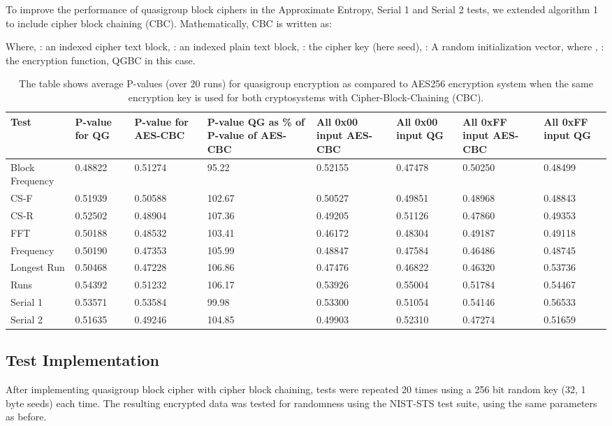 \documentclass[conference]{IEEEtran}
\begin{document}
To improve the performance of quasigroup block ciphers in the Approximate Entropy, Serial 1 and Serial 2 tests, we extended algorithm 1 to include cipher block chaining (CBC). Mathematically, CBC is written as:




Where, : an indexed cipher text block, : an indexed plain text block, : the cipher key (here seed), : A random initialization vector, where , : the encryption function, QGBC in this case.

\begin{table*}
\centering
\begin{tabular}{|p{2cm}|p{1.5cm}|p{1.5cm}|p{2.25cm}||p{1.5cm}|p{1.5cm}|p{1.5cm}|p{1.5cm}|}
\hline
Test & P-value for QG&  P-value for AES-CBC&  P-value QG as \% of P-value of AES-CBC& All 0x00 input AES-CBC& All 0x00 input QG& All 0xFF input AES-CBC& All 0xFF input QG\\ \hline
Block Frequency& 0.48822&  0.51274&  95.22& 0.52155& 0.47478& 0.50250& 0.48499 \\ \hline
CS-F& 0.51939&  0.50588&  102.67& 0.50527& 0.49851& 0.48968& 0.48843\\ \hline
CS-R& 0.52502&  0.48904&  107.36& 0.49205& 0.51126& 0.47860& 0.49353\\ \hline
FFT& 0.50188&  0.48532&  103.41& 0.46172& 0.48304& 0.49187& 0.49118\\ \hline
Frequency& 0.50190&  0.47353&  105.99& 0.48847& 0.47584& 0.46486& 0.48745\\ \hline
Longest Run& 0.50468&  0.47228&  106.86& 0.47476& 0.46822& 0.46320& 0.53736\\ \hline
Runs& 0.54392&  0.51232&  106.17& 0.53926& 0.55004& 0.51784& 0.54467\\ \hline
Serial 1& 0.53571&  0.53584&  99.98& 0.53300& 0.51054& 0.54146& 0.56533\\ \hline
Serial 2& 0.51635&  0.49246&  104.85& 0.49903& 0.52310& 0.47274& 0.51659\\ \hline
\end{tabular}
\caption{The table shows average P-values (over 20 runs) for quasigroup encryption as compared to AES256 encryption system when the same encryption key is used for both cryptosystems with Cipher-Block-Chaining (CBC).}
\vspace{-0.28in}
\label{table_P-value_with_CBC}
\end{table*}

\subsection{Test Implementation}
After implementing quasigroup block cipher with cipher block chaining, tests were repeated 20 times using a 256 bit random key (32, 1 byte seeds) each time. The resulting encrypted data was tested for randomness using the NIST-STS test suite, using the same parameters as before.
\end{document}
